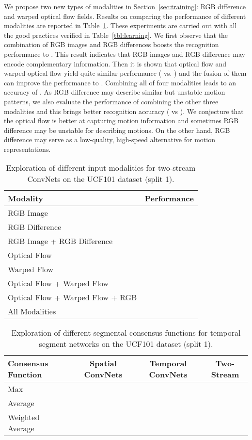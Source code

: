 \documentclass[runningheads]{llncs}
\newcommand{\SEGNET}{temporal segment network}
\begin{document}
We propose two new types of modalities in Section~\ref{sec:training}: RGB difference and warped optical flow fields. 
Results on comparing the performance of different modalities are reported in Table~\ref{tbl:modality}. 
These experiments are carried out with all the good practices verified in Table~\ref{tbl:learning}. We first observe that the combination of RGB images and RGB differences boosts the recognition performance to  . This result indicates that RGB images and RGB difference may encode complementary information. Then it is shown that optical flow and warped optical flow yield quite similar performance ( vs. ) and the fusion of them can improve the performance to . Combining all of four modalities leads to an accuracy of .  
As RGB difference may describe similar but unstable motion patterns, we also evaluate the performance of combining the other three modalities and this brings better recognition accuracy ( vs ). 
We conjecture that the optical flow is better at capturing motion information and sometimes RGB difference may be unstable for describing motions. 
On the other hand, RGB difference may serve as a low-quality, high-speed alternative for motion representations. 


\begin{table}[t]
	\begin{center}
		\caption{Exploration of different input modalities for two-stream ConvNets on the UCF101 dataset (split 1).}
		\label{tbl:modality}
		\begin{tabular}{|l|c|}
			\hline
			Modality & Performance \\
			\hline 
			RGB Image &   \\
			\hline
			RGB Difference &   \\
			\hline
			RGB Image + RGB Difference &  \\
			\hline \hline 
			Optical Flow  &  \\
			\hline
			Warped Flow &  \\
			\hline
			Optical Flow + Warped Flow &  \\
			\hline \hline
			Optical Flow + Warped Flow + RGB & \\
			\hline
			All Modalities& \\
			\hline
		\end{tabular}
	\end{center}
\end{table}

\begin{table}[t]
	\begin{center}
		\caption{Exploration of different segmental consensus functions for \SEGNET s on the UCF101 dataset (split 1).}
		\label{tbl:segmental}
		\begin{tabular}{|l|c|c|c|}
			\hline
			Consensus Function & Spatial ConvNets  & Temporal ConvNets & Two-Stream \\
			\hline 
			Max & &  &  \\
			\hline
			Average  &   &   &  \\
			\hline
			Weighted Average &  &  &  \\
			\hline
		\end{tabular}
	\end{center}
\end{table}
\end{document}
